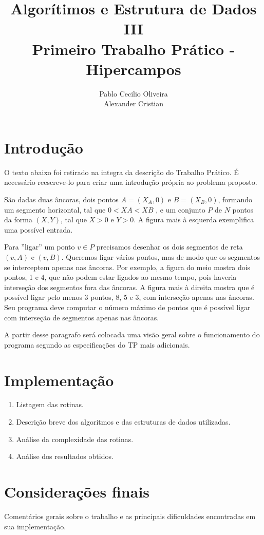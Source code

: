 \documentclass[12pt,a4paper]{article}
\author{Pablo Cecilio Oliveira\\
	Alexander Cristian}
\title{Algorítimos e Estrutura de Dados III\\
	Primeiro Trabalho Prático - Hipercampos}
\date{}
\begin{document}
\maketitle

\section{Introdução}

O texto abaixo foi retirado na integra da descrição do Trabalho Prático. É necessário reescreve-lo para criar uma introdução própria ao problema proposto.

São dadas duas âncoras, dois pontos $A = (X_A , 0)$ e $B = (X_B , 0)$, formando um segmento horizontal, tal que $0 < XA < XB$ , e um conjunto $P$ de $N$ pontos da forma $(X, Y)$, tal que $X > 0$ e $Y > 0$. A figura mais à esquerda exemplifica uma possível entrada.

Para ''ligar'' um ponto $v \in P$ precisamos desenhar os dois segmentos de reta $(v, A)$ e $(v, B)$. Queremos ligar vários pontos, mas de modo que os segmentos se interceptem apenas nas âncoras. Por exemplo, a figura do meio mostra dois pontos, 1 e 4, que não podem estar ligados ao mesmo tempo, pois haveria interseção dos segmentos fora das âncoras. A figura mais à direita mostra que é possível ligar pelo menos 3 pontos, 8, 5 e 3, com interseção apenas nas âncoras. Seu programa deve computar o número máximo de pontos que é possível ligar com interseção de segmentos apenas nas âncoras.

A partir desse paragrafo será colocada uma visão geral sobre o funcionamento do programa segundo as especificações do TP mais adicionais.

\section{Implementação}

\begin{enumerate}
\item Listagem das rotinas.
\item Descrição breve dos algoritmos e das estruturas de dados utilizadas.
\item Análise da complexidade das rotinas.
\item Análise dos resultados obtidos.
\end{enumerate}

\section{Considerações finais}

Comentários gerais sobre o trabalho e as principais dificuldades encontradas em sua implementação.

\begin{flushleft}
	\nocite{*}
	
\end{flushleft}
\end{document}
